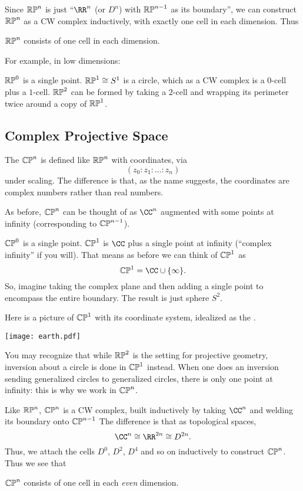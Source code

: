 \documentclass[11pt]{scrreprt}
\begin{document}
Since $\mathbb{RP}^n$ is just ``$\RR^n$ (or $D^n$) with $\mathbb{RP}^{n-1}$ as its boundary'',
we can construct $\mathbb{RP}^n$ as a CW complex inductively,
with exactly one cell in each dimension.
Thus
\begin{moral}
	$\mathbb{RP}^n$ consists of one cell in each dimension.
\end{moral}
For example, in low dimensions:
\begin{example}
	\listhack
	\begin{enumerate}[(a)]
		\ii $\mathbb{RP}^0$ is a single point.
		\ii $\mathbb{RP}^1 \cong S^1$ is a circle, which as a CW complex
		is a $0$-cell plus a $1$-cell.
		\ii $\mathbb{RP}^2$ can be formed by taking a $2$-cell
		and wrapping its perimeter twice around a copy of $\mathbb{RP}^1$.
	\end{enumerate}
\end{example}

\subsection*{Complex Projective Space}
The  $\mathbb{CP}^n$ is
defined like $\mathbb{RP}^n$ with coordinates, via\
\[ (z_0 : z_1 : \dots : z_n) \]
under scaling.
The difference is that, as the name suggests, the coordinates
are complex numbers rather than real numbers.

As before, $\mathbb{CP}^n$ can be thought of as $\CC^n$ augmented
with some points at infinity (corresponding to $\mathbb{CP}^{n-1}$).
\begin{example}
	\listhack
	\begin{enumerate}[(a)]
		\ii $\mathbb{CP}^0$ is a single point.
		\ii $\mathbb{CP}^1$ is $\CC$ plus a single point at infinity
		(``complex infinity'' if you will).
		That means as before we can think of $\mathbb{CP}^1$ as
		\[ \CP^1 = \CC \cup \{\infty\}. \]
		So, imagine taking the complex plane and then adding
		a single point to encompass the entire boundary.
		The result is just sphere $S^2$.
	\end{enumerate}
	Here is a picture of $\mathbb{CP}^1$ with its coordinate system,
	idealized as the .
	\begin{center}
		\texttt{[image: earth.pdf]}
	\end{center}
\end{example}

\begin{remark}
	You may recognize that while $\mathbb{RP}^2$ is the setting for projective geometry,
	inversion about a circle is done in $\mathbb{CP}^1$ instead.
	When one does an inversion sending generalized circles to generalized
	circles, there is only one point at infinity:
	this is why we work in $\mathbb{CP}^n$.
\end{remark}

Like $\mathbb{RP}^n$, $\mathbb{CP}^n$ is a CW complex, built inductively
by taking $\CC^n$ and welding its boundary onto $\mathbb{CP}^{n-1}$
The difference is that as topological spaces,
\[ \CC^n \cong \RR^{2n} \cong D^{2n}. \]
Thus, we attach the cells $D^0$, $D^2$, $D^4$ and so on
inductively to construct $\mathbb{CP}^n$.
Thus we see that
\begin{moral}
	$\mathbb{CP}^n$ consists of one cell in each \emph{even} dimension.
\end{moral}
\end{document}
